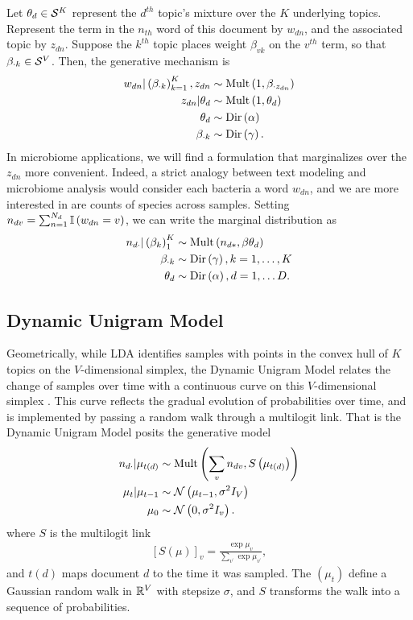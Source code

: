 \documentclass[oupdraft]{bio}
\begin{document}
Let $\theta_{d} \in \mathcal{S}^{K}$ represent the $d^{th}$ topic's mixture over the
$K$ underlying topics. Represent the term in the $n_{th}$ word of this document
by $w_{dn}$, and the associated topic by $z_{dn}$. Suppose the $k^{th}$ topic
places weight $\beta_{vk}$ on the $v^{th}$ term, so that $\beta_{\cdot k} \in
\mathcal{S}^{V}$. Then, the generative mechanism is
\begin{align*}
w_{dn} \vert \left(\beta_{\cdot k}\right)_{k = 1}^{K}, z_{dn} &\sim \textnormal{Mult}\left(1, \beta_{\cdot z_{dn}}\right) \\
z_{dn} \vert \theta_{d} &\sim \textnormal{Mult}\left(1, \theta_{d}\right) \\
\theta_{d} &\sim \textnormal{Dir}\left(\alpha\right) \\
\beta_{\cdot k} &\sim \textnormal{Dir}\left(\gamma\right).
\end{align*}
In microbiome applications, we will find a formulation that marginalizes over
the $z_{dn}$ more convenient. Indeed, a strict analogy between text modeling and
microbiome analysis would consider each bacteria a word $w_{dn}$, and we are
more interested in are counts of species across samples. Setting $n_{dv} =
\sum_{n = 1}^{N_{d}} \mathbb{I}\left({w_{dn} = v}\right)$, we can write the marginal distribution
as
\begin{align*}
n_{d\cdot} \vert \left(\beta_{k}\right)_{1}^{K} &\sim \textnormal{Mult}\left(n_{d\ast}, \beta \theta_{d}\right) \\
\beta_{\cdot k} &\sim \textnormal{Dir}\left(\gamma\right), k = 1, \dots, K \\
\theta_{d} &\sim \textnormal{Dir}\left(\alpha\right), d = 1, \dots D.
\end{align*}

\subsection{Dynamic Unigram Model}

Geometrically, while LDA identifies samples with points in the convex hull of
$K$ topics on the $V$-dimensional simplex, the Dynamic Unigram Model relates the
change of samples over time with a continuous curve on this $V$-dimensional
simplex \citep{blei2006dynamic}. This curve reflects the gradual evolution of
probabilities over time, and is implemented by passing a random walk through a
multilogit link. That is the Dynamic Unigram Model posits the generative model
\begin{align*}
n_{d\cdot} \vert \mu_{t\left(d\right)}  &\sim \textnormal{Mult}\left(\sum_{v} n_{dv}, S\left(\mu_{t\left(d\right)}\right)\right) \\
\mu_{t} \vert \mu_{t - 1} &\sim \mathcal{N}\left(\mu_{t - 1}, \sigma^{2}I_{V}\right) \\
\mu_{0} &\sim \mathcal{N}\left(0, \sigma^{2}I_{v}\right).
\end{align*}
where $S$ is the multilogit link
\begin{align*}
\left[S\left(\mu\right)\right]_{v} = \frac{\exp{\mu_{v}}}{\sum_{v^{\prime}} \exp{\mu_{v^{\prime}}}},
\end{align*}
and $t\left(d\right)$ maps document $d$ to the time it was sampled. The
$\left(\mu_{t}\right)$ define a Gaussian random walk in $\mathbb{R}^{V}$ with
stepsize $\sigma$, and $S$ transforms the walk into a sequence of probabilities.
\end{document}
